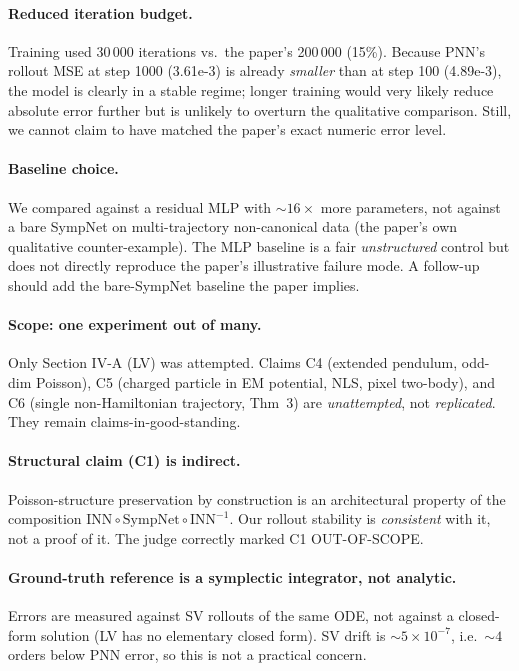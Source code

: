 \documentclass[11pt]{article}
\begin{document}
\paragraph{Reduced iteration budget.} Training used 30\,000 iterations
vs.\ the paper's 200\,000 (15\%). Because PNN's rollout MSE at step 1000
(3.61e-3) is already \emph{smaller} than at step 100 (4.89e-3), the model is
clearly in a stable regime; longer training would very likely reduce absolute
error further but is unlikely to overturn the qualitative comparison. Still,
we cannot claim to have matched the paper's exact numeric error level.

\paragraph{Baseline choice.} We compared against a residual MLP with
$\sim 16\times$ more parameters, not against a bare SympNet on multi-trajectory
non-canonical data (the paper's own qualitative counter-example). The MLP
baseline is a fair \emph{unstructured} control but does not directly reproduce
the paper's illustrative failure mode. A follow-up should add the bare-SympNet
baseline the paper implies.

\paragraph{Scope: one experiment out of many.} Only Section IV-A (LV) was
attempted. Claims C4 (extended pendulum, odd-dim Poisson), C5 (charged particle
in EM potential, NLS, pixel two-body), and C6 (single non-Hamiltonian
trajectory, Thm~3) are \emph{unattempted}, not \emph{replicated}. They remain
claims-in-good-standing.

\paragraph{Structural claim (C1) is indirect.} Poisson-structure preservation
by construction is an architectural property of the composition
$\mathrm{INN}\circ\mathrm{SympNet}\circ\mathrm{INN}^{-1}$. Our rollout stability
is \emph{consistent} with it, not a proof of it. The judge correctly marked C1
OUT-OF-SCOPE.

\paragraph{Ground-truth reference is a symplectic integrator, not analytic.}
Errors are measured against SV rollouts of the same ODE, not against a
closed-form solution (LV has no elementary closed form). SV drift is
$\sim 5\times 10^{-7}$, i.e.\ $\sim 4$ orders below PNN error, so this is not
a practical concern.
\end{document}
